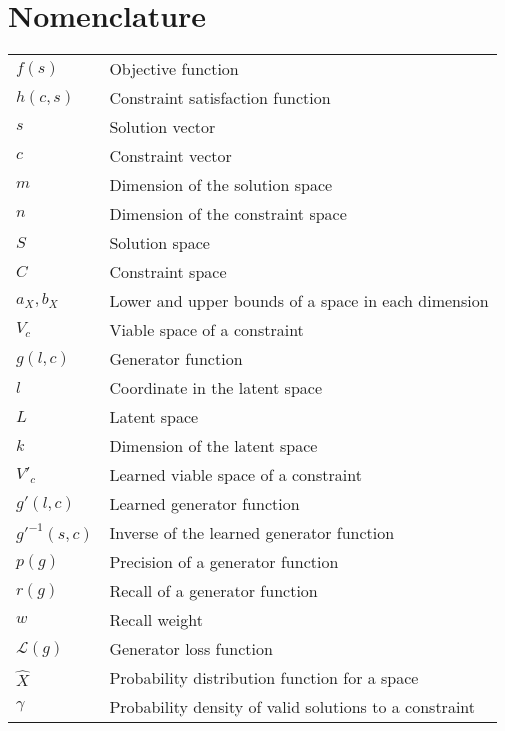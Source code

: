 \documentclass[../main.tex]{subfiles}
\begin{document}
\chapter*{Nomenclature}

\begin{tabular}{ l l }
    $f(s)$ & Objective function \\ 
    $h(c, s)$ & Constraint satisfaction function \\  
    $s$ & Solution vector \\
    $c$ & Constraint vector \\
    $m$ & Dimension of the solution space \\
    $n$ & Dimension of the constraint space \\
    $S$ & Solution space \\
    $C$ & Constraint space \\
    $a_X, b_X$ & Lower and upper bounds of a space in each dimension \\
    $V_c$ & Viable space of a constraint \\
    $g(l, c)$ & Generator function \\
    $l$ & Coordinate in the latent space \\
    $L$ & Latent space \\
    $k$ & Dimension of the latent space \\
    $V'_c$ & Learned viable space of a constraint \\
    $g'(l, c)$ & Learned generator function \\
    $g'^{-1}(s, c)$ & Inverse of the learned generator function \\
    $p(g)$ & Precision of a generator function \\
    $r(g)$ & Recall of a generator function \\
    $w$ & Recall weight \\
    $\mathcal{L}(g)$ & Generator loss function \\
    $\hat{X}$ & Probability distribution function for a space \\
    $\gamma$ & Probability density of valid solutions to a constraint \\
\end{tabular}
\end{document}
